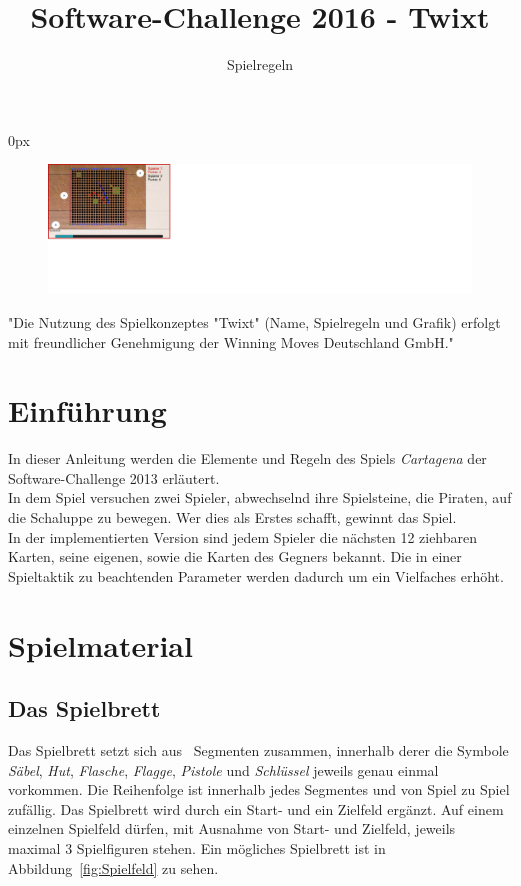 \documentclass[a4paper, ngerman]{scrartcl}
\title{Software-Challenge 2016 - Twixt}
\subtitle{Spielregeln}
\begin{document}
\parindent0px
\maketitle

\begin{figure}[h]
	\centering
	\includegraphics[width=\linewidth]{bilder/Uebersicht.png}
\end{figure}
\vspace*{\fill}
"Die Nutzung des Spielkonzeptes "Twixt" (Name, Spielregeln und Grafik)
erfolgt mit freundlicher Genehmigung der Winning Moves Deutschland GmbH."
\newpage
\tableofcontents
\newpage

\section{Einführung}
In dieser Anleitung werden die Elemente und Regeln des Spiels \emph{Cartagena}
der Software-Challenge 2013 erläutert.\\
In dem Spiel versuchen zwei Spieler,
abwechselnd ihre Spielsteine, die Piraten, auf die Schaluppe zu bewegen. Wer
dies als Erstes schafft, gewinnt das Spiel.\\
In der implementierten Version sind jedem Spieler die nächsten 12 ziehbaren
Karten, seine eigenen, sowie die Karten des Gegners bekannt. Die
in einer Spieltaktik zu beachtenden Parameter werden dadurch um ein Vielfaches
erhöht.

\section{Spielmaterial}
	\subsection{Das Spielbrett}
Das Spielbrett setzt sich aus \SpielSegmenteAnzahl\ Segmenten zusammen,
innerhalb derer die Symbole \emph{Säbel},  \emph{Hut}, \emph{Flasche},
\emph{Flagge}, \emph{Pistole} und \emph{Schlüssel} jeweils genau einmal
vorkommen.
Die Reihenfolge ist innerhalb jedes Segmentes und von Spiel zu Spiel zufällig.
Das Spielbrett wird durch ein Start- und ein Zielfeld ergänzt.
Auf einem einzelnen Spielfeld dürfen, mit Ausnahme von Start- und Zielfeld,
jeweils maximal 3 Spielfiguren stehen. Ein mögliches Spielbrett ist in
Abbildung~\ref{fig:Spielfeld} zu sehen.
\end{document}
